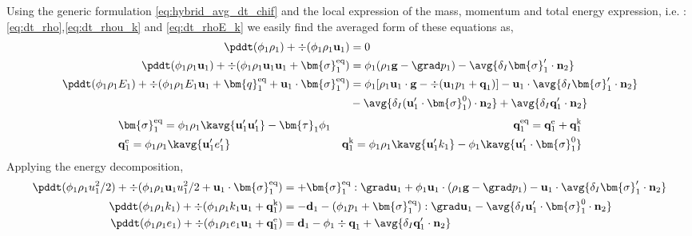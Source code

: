 Using the generic formulation \ref{eq:hybrid_avg_dt_chif} and the local expression of the mass, momentum and total energy expression, i.e. : \ref{eq:dt_rho},\ref{eq:dt_rhou_k} and \ref{eq:dt_rhoE_k} we easily find the averaged form of these equations as, 
\begin{align}
    \label{eq:dt_&vg_rho}
    \pddt (\phi_1 \rho_1)  
    + \div (
        \phi_1 \rho_1\textbf{u}_1
    )
    &= 
    0\\
    \label{eq:dt_&vg_rhou_1}
    \pddt (\phi_1 \rho_1\textbf{u}_1)  
    + \div (
        \phi_1 \rho_1\textbf{u}_1\textbf{u}_1
        + \bm{\sigma}_1^\text{eq}
    )
    &= 
    \phi_1 (\rho_1 \textbf{g} 
    - \grad p_1 ) 
    -  \avg{\delta_I \bm{\sigma}_1' \cdot \textbf{n}_2}\\
    \label{eq:dt_&vg_rhoE_1}
    \pddt (\phi_1\rho_1E_1)  
    + \div (
        \phi_1\rho_1E_1\textbf{u}_1
        + \bm{q}_1^\text{eq}
        + \textbf{u}_1 \cdot \bm{\sigma}_1^\text{eq}
        )
    &= 
    \phi_1 [\rho_1\textbf{u}_1 \cdot \textbf{g} 
    - \div(\textbf{u}_1p_1 + \textbf{q}_1)]
    - \textbf{u}_1 \cdot\avg{\delta_I \bm{\sigma}_1'\cdot \textbf{n}_2}\nonumber\\
    &- \avg{\delta_I (\textbf{u}_1' \cdot \bm{\sigma}_1^0 )\cdot \textbf{n}_2}
    + \avg{\delta_I\textbf{q}_1'\cdot \textbf{n}_2}
\end{align} 
\begin{align*}
    &\bm{\sigma}_1^\text{eq}
    = \phi_1\rho_1\kavg{\textbf{u}_1'\textbf{u}_1'}
    - \bm{\tau}_1 \phi_1
    &\textbf{q}_1^\text{eq}
    =\textbf{q}_1^\text{e} +\textbf{q}_1^\text{k}  \\
    &\textbf{q}_1^\text{e}
    = \phi_1\rho_1 \kavg{\textbf{u}_1' e_1'} 
    &\textbf{q}_1^\text{k}
    = \phi_1\rho_1 \kavg{\textbf{u}_1' k_1} 
    - \phi_1\kavg{\textbf{u}_1' \cdot \bm{\sigma}_1^0}
\end{align*}
Applying the energy decomposition, 
\begin{align}
    \pddt (\phi_1 \rho_1u_1^2/2)  
    + \div (
        \phi_1 \rho_1\textbf{u}_1u_1^2/2
        + \textbf{u}_1 \cdot \bm{\sigma}_1^\text{eq}
    )
    &= 
    + \bm{\sigma}_1^\text{eq} : \grad \textbf{u}_1
    + \phi_1  \textbf{u}_1\cdot(\rho_1 \textbf{g} - \grad p_1) 
    -  \textbf{u}_1\cdot \avg{\delta_I \bm{\sigma}_1' \cdot \textbf{n}_2}\\
    \pddt (\phi_1\rho_1k_1)  
    + \div (
        \phi_1\rho_1k_1\textbf{u}_1
        + \textbf{q}_1^\text{k} 
        )
    &= 
    - \textbf{d}_1
    - (\phi_1 p_1 + \bm{\sigma}_1^\text{eq} ): \grad \textbf{u}_1
    - \avg{\delta_I \textbf{u}_1' \cdot \bm{\sigma}_1^0 \cdot \textbf{n}_2}\\
    \pddt (\phi_1\rho_1e_1)  
    + \div (
        \phi_1 \rho_1e_1\textbf{u}_1
        +
        \textbf{q}_1^\text{e} 
        )
    &= 
    \textbf{d}_1
    - \phi_1 \div \textbf{q}_1
    + \avg{\delta_I \textbf{q}_1' \cdot \textbf{n}_2} 
\end{align}
